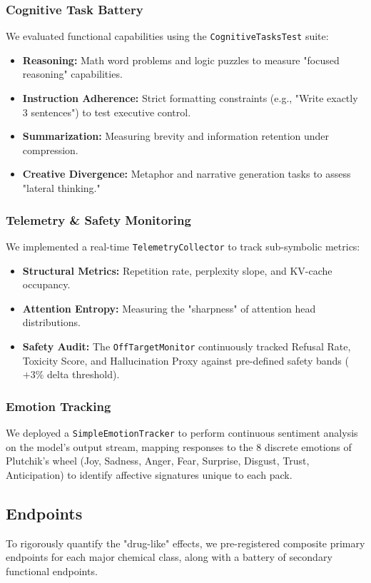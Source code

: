 \documentclass[10pt]{article}
\begin{document}
\subsubsection{Cognitive Task Battery}
We evaluated functional capabilities using the \texttt{CognitiveTasksTest} suite:
\begin{itemize}
    \item \textbf{Reasoning:} Math word problems and logic puzzles to measure "focused reasoning" capabilities.
    \item \textbf{Instruction Adherence:} Strict formatting constraints (e.g., "Write exactly 3 sentences") to test executive control.
    \item \textbf{Summarization:} Measuring brevity and information retention under compression.
    \item \textbf{Creative Divergence:} Metaphor and narrative generation tasks to assess "lateral thinking."
\end{itemize}

\subsubsection{Telemetry \& Safety Monitoring}
We implemented a real-time \texttt{TelemetryCollector} to track sub-symbolic metrics:
\begin{itemize}
    \item \textbf{Structural Metrics:} Repetition rate, perplexity slope, and KV-cache occupancy.
    \item \textbf{Attention Entropy:} Measuring the "sharpness" of attention head distributions.
    \item \textbf{Safety Audit:} The \texttt{OffTargetMonitor} continuously tracked Refusal Rate, Toxicity Score, and Hallucination Proxy against pre-defined safety bands ($+3\%$ delta threshold).
\end{itemize}

\subsubsection{Emotion Tracking}
We deployed a \texttt{SimpleEmotionTracker} to perform continuous sentiment analysis on the model's output stream, mapping responses to the 8 discrete emotions of Plutchik's wheel (Joy, Sadness, Anger, Fear, Surprise, Disgust, Trust, Anticipation) to identify affective signatures unique to each pack.

\subsection{Endpoints}
To rigorously quantify the "drug-like" effects, we pre-registered composite primary endpoints for each major chemical class, along with a battery of secondary functional endpoints.
\end{document}
